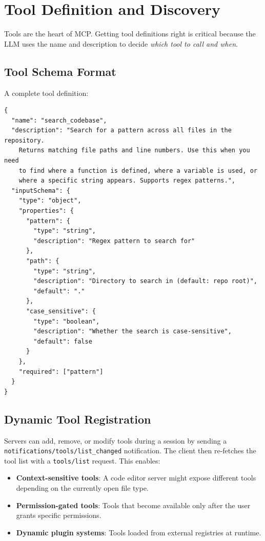 \section{Tool Definition and Discovery}
\label{sec:mcp:tools}

Tools are the heart of MCP. Getting tool definitions right is critical because the LLM uses the name and description to decide \emph{which tool to call and when}.

\subsection{Tool Schema Format}
\label{tool-schema-format}

A complete tool definition:

\begin{lstlisting}[style=pythonstyle]
{
  "name": "search_codebase",
  "description": "Search for a pattern across all files in the repository.
    Returns matching file paths and line numbers. Use this when you need
    to find where a function is defined, where a variable is used, or
    where a specific string appears. Supports regex patterns.",
  "inputSchema": {
    "type": "object",
    "properties": {
      "pattern": {
        "type": "string",
        "description": "Regex pattern to search for"
      },
      "path": {
        "type": "string",
        "description": "Directory to search in (default: repo root)",
        "default": "."
      },
      "case_sensitive": {
        "type": "boolean",
        "description": "Whether the search is case-sensitive",
        "default": false
      }
    },
    "required": ["pattern"]
  }
}
\end{lstlisting}

\subsection{Dynamic Tool Registration}
\label{dynamic-tool-registration}

Servers can add, remove, or modify tools during a session by sending a \texttt{notifications/tools/list\_changed} notification. The client then re-fetches the tool list with a \texttt{tools/list} request. This enables:

\begin{itemize}
  \item \textbf{Context-sensitive tools}: A code editor server might expose different tools depending on the currently open file type.
  \item \textbf{Permission-gated tools}: Tools that become available only after the user grants specific permissions.
  \item \textbf{Dynamic plugin systems}: Tools loaded from external registries at runtime.
\end{itemize}


